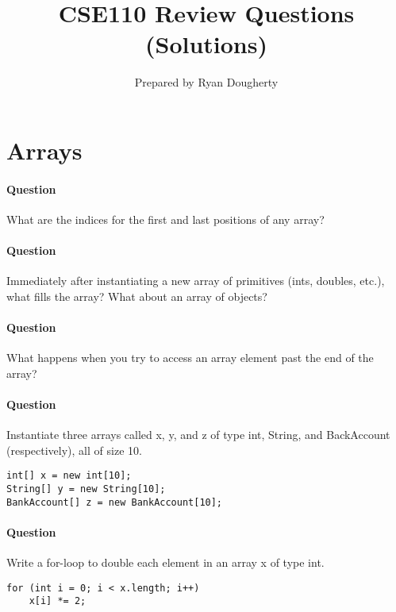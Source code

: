 \documentclass{article}
\title{CSE110 Review Questions (Solutions)}
\author{Prepared by Ryan Dougherty}
\date{}
\begin{document}
\maketitle

\section{Arrays}


\setcounter{question_num}{1}
\paragraph{Question }
What are the indices for the first and last positions of any array?

\addtocounter{question_num}{1}
\paragraph{Question }
Immediately after instantiating a new array of primitives (ints, doubles, etc.), what fills the array? What about an array of objects?

\addtocounter{question_num}{1}
\paragraph{Question }
What happens when you try to access an array element past the end of the array?

\addtocounter{question_num}{1}
\paragraph{Question }
Instantiate three arrays called x, y, and z of type int, String, and BackAccount (respectively), all of size 10.
\begin{lstlisting}
int[] x = new int[10];
String[] y = new String[10];
BankAccount[] z = new BankAccount[10];
\end{lstlisting}

\addtocounter{question_num}{1}
\paragraph{Question }
Write a for-loop to double each element in an array x of type int.
\begin{lstlisting}
for (int i = 0; i < x.length; i++)
	x[i] *= 2;
\end{lstlisting}
\end{document}
